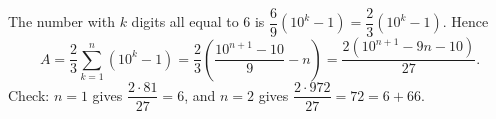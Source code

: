 The number with $k$ digits all equal to $6$ is $\dfrac{6}{9}\left(10^k-1\right)=\dfrac{2}{3}\left(10^k-1\right)$. Hence
\[
A=\dfrac{2}{3}\sum_{k=1}^{n}\left(10^k-1\right)=\dfrac{2}{3}\left(\dfrac{10^{n+1}-10}{9}-n\right)=\boxed{\dfrac{2\left(10^{n+1}-9n-10\right)}{27}}.
\]
Check: $n=1$ gives $\dfrac{2\cdot81}{27}=6$, and $n=2$ gives $\dfrac{2\cdot972}{27}=72=6+66$.

